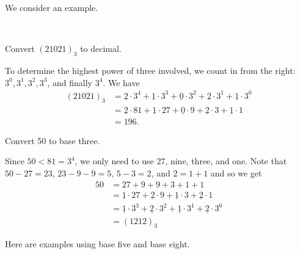We consider an example.

\begin{exam}
\label{exam_ternary} 
~
    \begin{apart}
        \item Convert $(21021)_3$ to decimal.
            \begin{soln}
                To determine the highest power of three involved, we count in from the right: $3^0, 3^1, 3^2, 3^3$, and finally $3^4$.  We have
                    \begin{align*}
                    (21021)_3 & =\underline{2}\cdot 3^4 +\underline{1}\cdot 3^3 +\underline{0}\cdot 3^2 +\underline{2}\cdot 3^1 +\underline{1}\cdot 3^0 \\
                    &=\underline{2}\cdot 81 +\underline{1}\cdot 27 +\underline{0}\cdot 9 +\underline{2}\cdot 3 +\underline{1}\cdot 1 \\
                    & = 196.
                    \end{align*}
            \end{soln}
        \item Convert 50 to base three.
            \begin{soln}
                Since $50 < 81 = 3^4$, we only need to use 27, nine, three, and one.  Note that $50-27 = 23$, $23-9-9 = 5$,  $5-3=2$, and $2=1+1$ and so we get
                    \begin{align*}
                    50 & = 27 + 9 + 9 + 3 + 1 + 1 \\
                    & =\underline{1}\cdot 27 +\underline{2}\cdot 9 + \underline{1}\cdot 3 + \underline{2}\cdot 1 \\
                    & = \underline{1}\cdot 3^3 + \underline{2}\cdot 3^2 +  \underline{1} \cdot 3^1 +  \underline{2} \cdot 3^0 \\
                    & = (1212)_3
                    \end{align*}
            \end{soln}
    \end{apart}
\end{exam}

Here are examples using base five and base eight.

